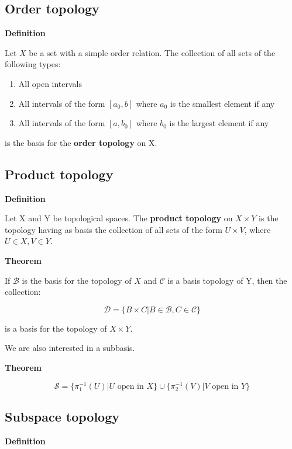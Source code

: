 \documentclass[11pt]{article}
\begin{document}
\subsection{Order topology}
\label{sec:org3a5faee}

\textbf{Definition}

Let \(X\) be a set with a simple order relation. The collection of all sets of the following types:

\begin{enumerate}
\item All open intervals
\item All intervals of the form \([a_0,b]\) where \(a_0\) is the smallest element if any
\item All intervals of the form \([a,b_0]\) where \(b_0\) is the largest element if any
\end{enumerate}

is the basis for the \textbf{order topology} on X.

\subsection{Product topology}
\label{sec:orga7059a3}

\textbf{Definition}

Let X and Y be topological spaces. The \textbf{product topology} on \(X \times Y\) is the topology having as basis the collection of all sets of the form \(U \times V\), where \(U \in X, V \in Y\).

\textbf{Theorem}

If \(\mathcal{B}\) is the basis for the topology of \(X\) and \(\mathcal{C}\) is a basis topology of Y, then the collection:


\[
\mathcal{D} = \{B \times C \vert B \in \mathcal{B}, C \in \mathcal{C}\}
\]

is a basis for the topology of \(X \times Y\).


We are also interested in a subbasis.

\textbf{Theorem}

\[
\mathcal{S} = \{\pi_1^{-1}(U) \vert U \text{ open in } X \} \cup \{\pi_2^{-1}(V) \vert V \text{ open in } Y \}
\]

\subsection{Subspace topology}
\label{sec:orge8897f5}

\textbf{Definition}
\end{document}
